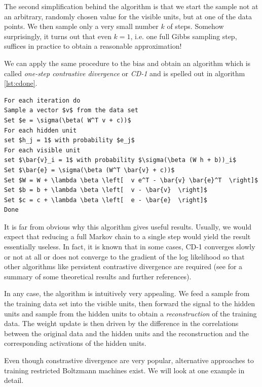 \documentclass[a4paper, draft]{article}
\theoremstyle{own}
\theoremstyle{remark}
\begin{document}
The second simplification behind the algorithm is that we start the sample not at an arbitrary, randomly chosen value for the visible units, but at one of the data points. We then sample only a very small number $k$ of steps. Somehow surprisingly, it turns out that even $k=1$, i.e. one full Gibbs sampling step, suffices in practice to obtain a reasonable approximation! 

We can apply the same procedure to the bias and obtain an algorithm which is called {\em one-step contrastive divergence} or {\em CD-1} and is spelled out in algorithm \ref{lst:cdone}. 



\begin{lstlisting}[mathescape=true,frame=single, label=lst:cdone, float=ht,
captionpos=t, caption=One-step contrastive divergence]
For each iteration do
Sample a vector $v$ from the data set
Set $e = \sigma(\beta( W^T v + c))$
For each hidden unit
set $h_j = 1$ with probability $e_j$
For each visible unit
set $\bar{v}_i = 1$ with probability $\sigma(\beta (W h + b))_i$
Set $\bar{e} = \sigma(\beta (W^T \bar{v} + c))$
Set $W = W + \lambda \beta \left[  v e^T - \bar{v} \bar{e}^T  \right]$
Set $b = b + \lambda \beta \left[  v - \bar{v}  \right]$
Set $c = c + \lambda \beta \left[  e - \bar{e}  \right]$
Done
\end{lstlisting}


It is far from obvious why this algorithm gives useful results. Usually, we would expect that reducing a full Markov chain to a single step would yield the result essentially useless. In fact, it is known that in some cases, CD-1 converges slowly or not at all or does not converge to the gradient of the log likelihood so that other algorithms like persistent contrastive divergence are required (see \cite{FischerIgel2014} for a summary of some theoretical results and further references). 

In any case, the algorithm is intuitively very appealing. We feed a sample from the training data set into the visible units, then forward the signal to the hidden units and sample from the hidden units to obtain a {\em reconstruction} of the training data. The weight update is then driven by the difference in the correlations between the original data and the hidden units and the reconstruction and the corresponding activations of the hidden units. 



Even though constrastive divergence are very popular, alternative approaches to training restricted Boltzmann machines exist. We will look at one example in detail. 
\end{document}
